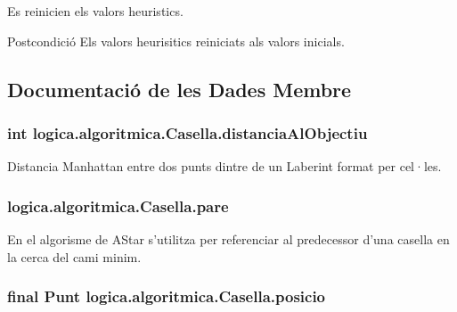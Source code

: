 Es reinicien els valors heuristics. 

\begin{DoxyPostcond}{Postcondició}
Els valors heurisitics reiniciats als valors inicials. 
\end{DoxyPostcond}


\subsection{Documentació de les Dades Membre}
\hypertarget{classlogica_1_1algoritmica_1_1_casella_ad412db755fc91149053db6100870bf70}{
\subsubsection[{distancia\+Al\+Objectiu}]{\setlength{\rightskip}{0pt plus 5cm}int logica.\+algoritmica.\+Casella.\+distancia\+Al\+Objectiu\hspace{0.3cm}{\ttfamily [private]}}}\label{classlogica_1_1algoritmica_1_1_casella_ad412db755fc91149053db6100870bf70}
Distancia Manhattan entre dos punts dintre de un Laberint format per cel·les. \hypertarget{classlogica_1_1algoritmica_1_1_casella_a2b3a9ec985ee8925d1b11ef42e1b3b80}{
\subsubsection[{pare}]{ logica.\+algoritmica.\+Casella.\+pare\hspace{0.3cm}{\ttfamily [private]}}}\label{classlogica_1_1algoritmica_1_1_casella_a2b3a9ec985ee8925d1b11ef42e1b3b80}
En el algorisme de A\+Star s'utilitza per referenciar al predecessor d'una casella en la cerca del cami minim. \hypertarget{classlogica_1_1algoritmica_1_1_casella_ad26c2e494cfa1a9362cf001a061ea375}{
\subsubsection[{posicio}]{\setlength{\rightskip}{0pt plus 5cm}final {\bf Punt} logica.\+algoritmica.\+Casella.\+posicio\hspace{0.3cm}{\ttfamily [private]}}}\label{classlogica_1_1algoritmica_1_1_casella_ad26c2e494cfa1a9362cf001a061ea375}
